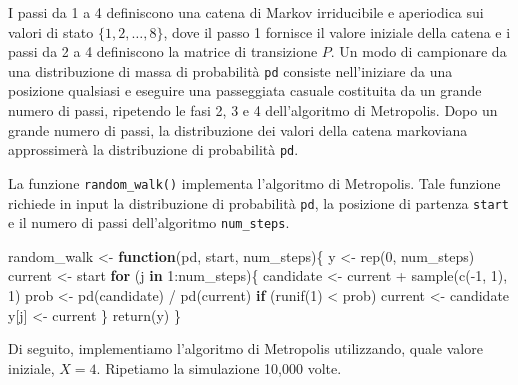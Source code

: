 \documentclass[
  10pt,
  italian,
  a4paper,
  extrafontsizes,onecolumn,openright
  ]{memoir}
\newenvironment{Shaded}{\begin{snugshade}}{\end{snugshade}}
\newcommand{\ControlFlowTok}[1]{\textcolor[rgb]{0.13,0.29,0.53}{\textbf{#1}}}
\newcommand{\DecValTok}[1]{\textcolor[rgb]{0.00,0.00,0.81}{#1}}
\newcommand{\FunctionTok}[1]{\textcolor[rgb]{0.00,0.00,0.00}{#1}}
\newcommand{\NormalTok}[1]{#1}
\newcommand{\OtherTok}[1]{\textcolor[rgb]{0.56,0.35,0.01}{#1}}
\newcommand{\SpecialCharTok}[1]{\textcolor[rgb]{0.00,0.00,0.00}{#1}}
\begin{document}
I passi da 1 a 4 definiscono una catena di Markov irriducibile e aperiodica sui valori di stato \(\{1, 2,\dots, 8\}\), dove il passo 1 fornisce il valore iniziale della catena e i passi da 2 a 4 definiscono la matrice di transizione \(P\). Un modo di campionare da una distribuzione di massa di probabilità \texttt{pd} consiste nell'iniziare da una posizione qualsiasi e eseguire una passeggiata casuale costituita da un grande numero di passi, ripetendo le fasi 2, 3 e 4 dell'algoritmo di Metropolis. Dopo un grande numero di passi, la distribuzione dei valori della catena markoviana approssimerà la distribuzione di probabilità \texttt{pd}.

La funzione \texttt{random\_walk()} implementa l'algoritmo di Metropolis. Tale funzione richiede in input la distribuzione di probabilità \texttt{pd}, la posizione di partenza \texttt{start} e il numero di passi dell'algoritmo \texttt{num\_steps}.

\begin{Shaded}
\begin{Highlighting}[]
\NormalTok{random\_walk }\OtherTok{\textless{}{-}} \ControlFlowTok{function}\NormalTok{(pd, start, num\_steps)\{}
\NormalTok{  y }\OtherTok{\textless{}{-}} \FunctionTok{rep}\NormalTok{(}\DecValTok{0}\NormalTok{, num\_steps)}
\NormalTok{  current }\OtherTok{\textless{}{-}}\NormalTok{ start}
  \ControlFlowTok{for}\NormalTok{ (j }\ControlFlowTok{in} \DecValTok{1}\SpecialCharTok{:}\NormalTok{num\_steps)\{}
\NormalTok{    candidate }\OtherTok{\textless{}{-}}\NormalTok{ current }\SpecialCharTok{+} \FunctionTok{sample}\NormalTok{(}\FunctionTok{c}\NormalTok{(}\SpecialCharTok{{-}}\DecValTok{1}\NormalTok{, }\DecValTok{1}\NormalTok{), }\DecValTok{1}\NormalTok{)}
\NormalTok{    prob }\OtherTok{\textless{}{-}} \FunctionTok{pd}\NormalTok{(candidate) }\SpecialCharTok{/} \FunctionTok{pd}\NormalTok{(current)}
    \ControlFlowTok{if}\NormalTok{ (}\FunctionTok{runif}\NormalTok{(}\DecValTok{1}\NormalTok{) }\SpecialCharTok{\textless{}}\NormalTok{ prob)}
\NormalTok{      current }\OtherTok{\textless{}{-}}\NormalTok{ candidate}
\NormalTok{    y[j] }\OtherTok{\textless{}{-}}\NormalTok{ current}
\NormalTok{  \}}
  \FunctionTok{return}\NormalTok{(y)}
\NormalTok{\}}
\end{Highlighting}
\end{Shaded}

\noindent
Di seguito, implementiamo l'algoritmo di Metropolis utilizzando, quale valore iniziale, \(X=4\). Ripetiamo la simulazione 10,000 volte.
\end{document}
